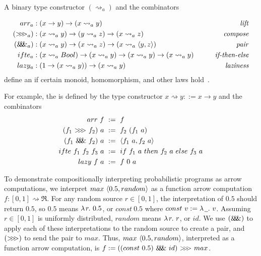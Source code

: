 \documentclass{llncs}
\newenvironment{displaybreaks}%
{%
	\begingroup%
	\allowdisplaybreaks%
}%
{%
	\endgroup%
	\ignorespacesafterend%
}
\newcommand{\arrow}{\rightsquigarrow}
\newcommand{\acomp}{\ensuremath{{>}\mspace{-6mu}{>}\mspace{-6mu}{>}}}
\newcommand{\apair}{\ensuremath{\mathit{\&\mspace{-7.5mu}\&\mspace{-7.5mu}\&}}}
\newcommand{\gen}{_a}
\begin{document}
\begin{definition}A binary type constructor $(\arrow\gen)$ and the combinators
\begin{displaybreaks}
\begin{equation*}
\begin{aligned}
	arr\gen &: (x \to y) \to (x \arrow\gen y)
		& \text{\emph{lift}}
\nobreak\\
	(\acomp\gen) &: (x \arrow\gen y) \to (y \arrow\gen z) \to (x \arrow\gen z)
		& \text{\emph{compose}}
\\
	(\apair\gen) &: (x \arrow\gen y) \to (x \arrow\gen z) \to (x \arrow\gen \pair{y,z})
		& \text{\emph{pair}}
\\
	ifte\gen &: (x \arrow\gen Bool) \to (x \arrow\gen y) \to (x \arrow\gen y) \to (x \arrow\gen y)
		\tab\tab& \text{\emph{if-then-else}}
\nobreak\\
	lazy\gen &: (1 \to (x \arrow\gen y)) \to (x \arrow\gen y)
		& \text{\emph{laziness}}
\label{eqn:arrow-combinators}
\end{aligned}
\end{equation*}
\end{displaybreaks}
define an  if certain monoid, homomorphism, and other laws hold~\cite{cit:hughes-2000scp-arrows}.
\end{definition}

For example, the  is defined by the type constructor $x \arrow y ::= x \to y$ and the combinators
\begin{equation}
\begin{aligned}
	arr~f &\ := \ f \\
	(f_1~\acomp~f_2)~a &\ := \ f_2~(f_1~a) \\
	(f_1~\apair~f_2)~a &\ := \ \pair{f_1~a,f_2~a} \\
	ifte~f_1~f_2~f_3~a &\ := \ if~f_1~a~then~f_2~a~else~f_3~a \\
	lazy~f~a &\ :=\ f~0~a
\label{eqn:function-arrow}
\end{aligned}
\end{equation}

To demonstrate compositionally interpreting probabilistic programs as arrow computations, we interpret $max~\langle{0.5,random}\rangle$ as a function arrow computation $f : [0,1] \arrow \Re$.
For any random source $r \in [0,1]$, the interpretation of $0.5$ should return $0.5$, so $0.5$ means $\lambda\mspace{2mu}{r}\ldotp\, 0.5$, or $const~0.5$ where $const~v := \lambda\mspace{2mu}{\underbar{\ \,}}\ldotp\,v$.
Assuming $r \in [0,1]$ is uniformly distributed, $random$ means $\lambda\mspace{2mu}{r}\ldotp\, r$, or $id$.
We use $(\apair)$ to apply each of these interpretations to the random source to create a pair, and $(\acomp)$ to send the pair to $max$.
Thus, $max~\langle{0.5,random}\rangle$, interpreted as a function arrow computation, is $f := ((const~0.5)~\apair~id)~\acomp~max$.
\end{document}

